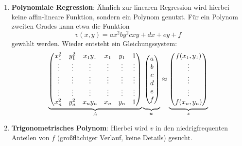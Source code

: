\begin{enumerate}[label = \alph*)]
\item \textbf{Polynomiale Regression}:
    Ähnlich zur linearen Regression wird hierbei keine affin-lineare Funktion, sondern ein Polynom genutzt. Für ein Polynom zweiten Grades kann etwa die Funktion
    \[v(x,y) = ax^2 by^2 cxy+ dx +ey +f\]
    gewählt werden. Wieder entsteht ein Gleichungssystem:
    \[
    \underbrace{\mat{x_1^2 & y_1^2 & x_1y_1 & x_1 & y_1 & 1 \\ 
                    \vdots & \vdots & \vdots & \vdots & \vdots & \vdots \\ 
                    \vdots & \vdots & \vdots & \vdots & \vdots & \vdots \\ 
                    \vdots & \vdots & \vdots & \vdots & \vdots & \vdots \\ 
                    x_n^2 & y_n^2 & x_ny_n & x_n & y_n & 1}}_{A} 
        \underbrace{\vphantom{\mat{f(x_1,y_1 \\ \vdots \\ \vdots \\ \vdots \\ f(x_n,y_n)}}
    \mat{a \\ b \\ c \\ d \\e \\ f}}_{w} 
\approx \underbrace{\mat{f(x_1,y_1) \\ \vdots \\ \vdots \\ \vdots \\ f(x_n,y_n)}}_{z}\]

  \item \textbf{Trigonometrisches Polynom}:
      Hierbei wird $v$ in den niedrigfrequenten Anteilen von $f$ (großflächiger Verlauf, keine Details) gesucht.

  \begin{center}
  \end{center}


\end{enumerate}
